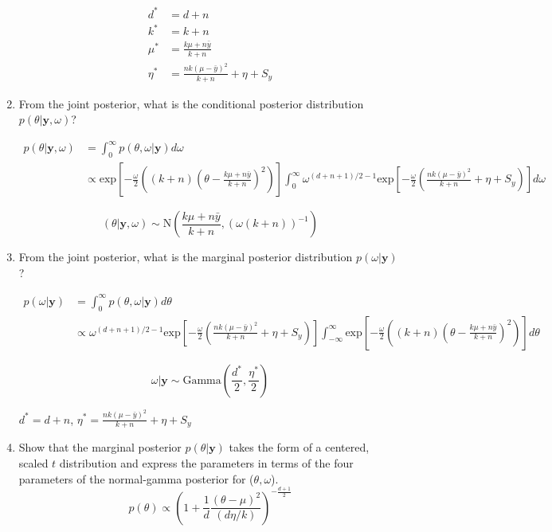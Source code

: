 \documentclass[10pt]{article}
\newcommand{\by}{\mathbf{y}}
\begin{document}
\begin{enumerate}[label=(\Alph*)]
        \begin{align*}
          d^* &= d+n \\
          k^* &= k+n \\
          \mu^* &= \frac{k\mu + n\bar{y}}{k + n}\\
          \eta^* &= \frac{nk (\mu - \bar{y})^2}{k+n} + \eta + S_y
        \end{align*}


      \item From the joint posterior, what is the conditional posterior distribution $p(\theta| \by, \omega)$?

        \begin{align*}
          p(\theta| \by, \omega) &= \int_0^{\infty} p(\theta, \omega | \by) d\omega \\
          & \propto \text{exp}\left[  -\frac{\omega}{2} \left( (k+n) \left( \theta - \frac{k\mu + n\bar{y}}{k+n}\right)^2 \right) \right] \int_0^{\infty} \omega^{(d+n+1)/2-1}  \text{exp}\left[ - \frac{\omega}{2}\left( \frac{nk(\mu - \bar{y})^2}{k+n} + \eta + S_y\right) \right] d\omega
        \end{align*}

        $$(\theta | \by, \omega) \sim \text{N} \left( \frac{k\mu + n \bar{y}}{k+n}, (\omega(k+n))^{-1}\right) $$

      \item From the joint posterior, what is the marginal posterior distribution $p(\omega | \by)$?

        \begin{align*}
          p(\omega| \by) &= \int_0^{\infty} p(\theta, \omega | \by) d\theta \\
          & \propto \omega^{(d+n+1)/2-1}  \text{exp}\left[ - \frac{\omega}{2}\left( \frac{nk(\mu - \bar{y})^2}{k+n} + \eta + S_y\right) \right] \int_{-\infty}^{\infty} \text{exp}\left[  -\frac{\omega}{2} \left( (k+n) \left( \theta - \frac{k\mu + n\bar{y}}{k+n}\right)^2 \right) \right]  d\theta
        \end{align*}

        $$\omega | \by \sim \text{Gamma}\left ( \frac{d^*}{2}, \frac{\eta^*}{2}\right)$$

        $d^* = d+n$, $\eta^* = \frac{nk (\mu - \bar{y})^2}{k+n} + \eta + S_y$

      \item Show that the marginal posterior $p(\theta | \by)$ takes the form of a centered, scaled $t$ distribution and express the parameters in terms of the four parameters of the normal-gamma posterior for ($\theta, \omega$).
        $$p(\theta) \propto \left ( 1 + \frac{1}{d} \frac{(\theta - \mu)^2}{(d \eta/ k)}\right)^{- \frac{d+1}{2}}$$


\end{enumerate}
\end{document}
